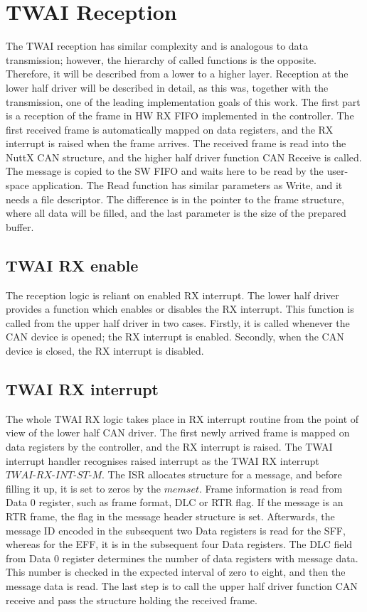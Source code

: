 \documentclass{ctuthesis}
\begin{document}
 \section{TWAI Reception}
 The TWAI reception has similar complexity and is analogous to data transmission; however, the hierarchy of called functions is the opposite. Therefore, it will be described from a lower to a higher layer. Reception at the lower half driver will be described in detail, as this was, together with the transmission, one of the leading implementation goals of this work. The first part is a reception of the frame in HW RX FIFO implemented in the controller. The first received frame is automatically mapped on data registers, and the RX interrupt is raised when the frame arrives. The received frame is read into the NuttX CAN structure, and the higher half driver function CAN Receive is called. The message is copied to the SW FIFO and waits here to be read by the user-space application. The Read function has similar parameters as Write, and it needs a file descriptor. The difference is in the pointer to the frame structure, where all data will be filled, and the last parameter is the size of the prepared buffer.
 
 \subsection{TWAI RX enable}
 The reception logic is reliant on enabled RX interrupt. The lower half driver provides a function which enables or disables the RX interrupt. This function is called from the upper half driver in two cases. Firstly, it is called whenever the CAN device is opened; the RX interrupt is enabled. Secondly, when the CAN device is closed, the RX interrupt is disabled.
 
 \subsection{TWAI RX interrupt}
 The whole TWAI RX logic takes place in RX interrupt routine from the point of view of the lower half CAN driver. The first newly arrived frame is mapped on data registers by the controller, and the RX interrupt is raised. The TWAI interrupt handler recognises raised interrupt as the TWAI RX interrupt $TWAI\text{-}RX\text{-}INT\text{-}ST\text{-}M$. The ISR allocates structure for a message, and before filling it up, it is set to zeros by the $memset$. Frame information is read from Data 0 register, such as frame format, DLC or RTR flag. If the message is an RTR frame, the flag in the message header structure is set. Afterwards, the message ID encoded in the subsequent two Data registers is read for the SFF, whereas for the EFF, it is in the subsequent four Data registers. The DLC field from Data 0 register determines the number of data registers with message data. This number is checked in the expected interval of zero to eight, and then the message data is read. The last step is to call the upper half driver function CAN receive and pass the structure holding the received frame.
 
\end{document}
